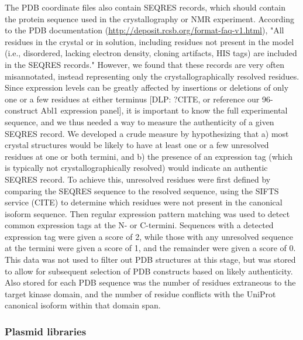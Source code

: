 \documentclass[aps,pre,twocolumn,nofootinbib,superscriptaddress,linenumbers]{revtex4-1}
\begin{document}
The PDB coordinate files also contain SEQRES records, which should contain the protein sequence used in the crystallography or NMR experiment.
According to the PDB documentation (\url{http://deposit.rcsb.org/format-faq-v1.html}), "All residues in the crystal or in solution, including residues not present in the model (i.e., disordered, lacking electron density, cloning artifacts, HIS tags) are included in the SEQRES records."
However, we found that these records are very often misannotated, instead representing only the crystallographically resolved residues.
Since expression levels can be greatly affected by insertions or deletions of only one or a few residues at either terminus {\color{blue}[DLP: ?CITE, or reference our 96-construct Abl1 expression panel]}, it is important to know the full experimental sequence, and we thus needed a way to measure the authenticity of a given SEQRES record.
We developed a crude measure by hypothesizing that a) most crystal structures would be likely to have at least one or a few unresolved residues at one or both termini, and b) the presence of an expression tag (which is typically not crystallographically resolved) would indicate an authentic SEQRES record.
To achieve this, unresolved residues were first defined by comparing the SEQRES sequence to the resolved sequence, using the SIFTS service (CITE) to determine which residues were not present in the canonical isoform sequence.
Then regular expression pattern matching was used to detect common expression tags at the N- or C-termini.
Sequences with a detected expression tag were given a score of 2, while those with any unresolved sequence at the termini were given a score of 1, and the remainder were given a score of 0.
This data was not used to filter out PDB structures at this stage, but was stored to allow for subsequent selection of PDB constructs based on likely authenticity.
Also stored for each PDB sequence was the number of residues extraneous to the target kinase domain, and the number of residue conflicts with the UniProt canonical isoform within that domain span.

\subsubsection{Plasmid libraries}
\end{document}
